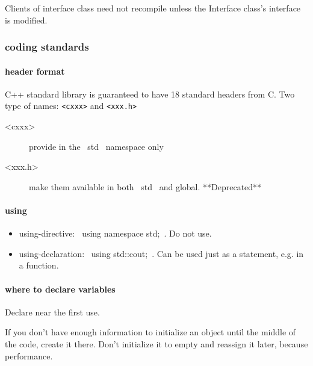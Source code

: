  Clients of interface class need not recompile unless the Interface class's interface is modified.
\subsubsection{coding standards}

\paragraph{header format}
C++ standard library is guaranteed to have 18 standard headers from C.
Two type of names: \verb$<cxxx>$ and \verb$<xxx.h>$

\begin{description}
\item [<cxxx>] provide in the ~std~ namespace only
\item [<xxx.h>] make them available in both ~std~ and global. **Deprecated**
\end{description}

\paragraph{using}
\begin{itemize}
\item using-directive: ~using namespace std;~. Do not use.
\item using-declaration: ~using std::cout;~. Can be used just as a
  statement, e.g. in a function.
\end{itemize}

\paragraph{where to declare variables}
Declare near the first use.

If you don't have enough information to initialize an object until the
middle of the code, create it there.  Don't initialize it to empty and
reassign it later, because performance.


